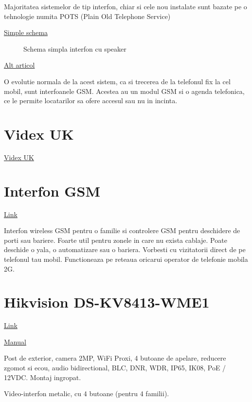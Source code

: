 Majoritatea sistemelor de tip interfon, chiar si cele nou instalate sunt bazate pe o tehnologie numita POTS (Plain Old Telephone Service) \cite{WinNT}

\href{https://www.epanorama.net/documents/telecom/telephone_intercom.html}{Simple schema}

\begin{figure}[h]
  \centering
  \caption{Schema simpla interfon cu speaker}
\end{figure}

\href{https://www.nextiva.com/blog/what-is-pots.html}{Alt articol}

O evolutie normala de la acest sistem, ca si trecerea de la telefonul fix la cel mobil, sunt interfoanele GSM. Acestea au un modul GSM si o agenda telefonica, ce le permite locatarilor sa ofere accesul sau nu in incinta.

\section {Videx UK}

\href{https://www.videxuk.com/system/gsm-intercoms/}{Videx UK}

\section {Interfon GSM}

\href{https://www.a2t.ro/interfoane-videointerfoane/interfon-wireless-gsm-pentru-o-familie.html}{Link}

Interfon wireless GSM pentru o familie si controlere GSM pentru deschidere de porti sau bariere. Foarte util pentru zonele in care nu exista cablaje. Poate deschide o yala, o automatizare sau o bariera. Vorbesti cu vizitatorii direct de pe telefonul tau mobil. Functioneaza pe reteaua oricarui operator de telefonie mobila 2G.

\section {Hikvision DS-KV8413-WME1}

\href{https://www.a2t.ro/videointerfon-wireless/videointerfon-full-hd-4-familii-control-acces-aplicat-tcp-ip-hikvision-ds-kv8413-wme1-s.html}{Link}

\href{https://www.hikvision.com/content/dam/hikvision/products/S000000001/S000000083/S000000129/S000000131/OFR000170/M000048926/User_Manual/UD20207B_Baseline_Video-Intercom-8-Series-Villa-Door-Station_User-Manual_V2.2.3.PDF}{Manual}


Post de exterior, camera 2MP, WiFi Proxi, 4 butoane de apelare, reducere zgomot si ecou, audio bidirectional, BLC, DNR, WDR, IP65, IK08, PoE / 12VDC. Montaj ingropat.

Video-interfon metalic, cu 4 butoane (pentru 4 familii).